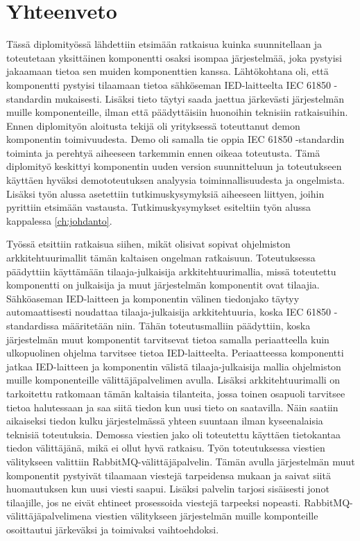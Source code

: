 \chapter{Yhteenveto}
\label{ch:yhteenveto}
Tässä diplomityössä lähdettiin etsimään ratkaisua kuinka suunnitellaan ja toteutetaan yksittäinen komponentti osaksi isompaa järjestelmää, joka pystyisi jakaamaan tietoa sen muiden komponenttien kanssa. Lähtökohtana oli, että komponentti pystyisi tilaamaan tietoa sähköseman IED-laitteelta IEC 61850 -standardin mukaisesti. Lisäksi tieto täytyi saada jaettua järkevästi järjestelmän muille komponenteille, ilman että päädyttäisiin huonoihin teknisiin ratkaisuihin. Ennen diplomityön aloitusta tekijä oli yrityksessä toteuttanut demon komponentin toimivuudesta. Demo oli samalla tie oppia IEC 61850 -standardin toiminta ja perehtyä aiheeseen tarkemmin ennen oikeaa toteutusta. Tämä diplomityö keskittyi komponentin uuden version suunnitteluun ja toteutukseen käyttäen hyväksi demototeutuksen analyysia toiminnallisuudesta ja ongelmista. Lisäksi työn alussa asetettiin tutkimuskysymyksiä aiheeseen liittyen, joihin pyrittiin etsimään vastausta. Tutkimuskysymykset esiteltiin työn alussa kappalessa \ref{ch:johdanto}.

Työssä etsittiin ratkaisua siihen, mikät olisivat sopivat ohjelmiston arkkitehtuurimallit tämän kaltaisen ongelman ratkaisuun. Toteutuksessa päädyttiin käyttämään tilaaja-julkaisija arkkitehtuurimallia, missä toteutettu komponentti on julkaisija ja muut järjestelmän komponentit ovat tilaajia. Sähköaseman IED-laitteen ja komponentin välinen tiedonjako täytyy automaattisesti noudattaa tilaaja-julkaisija arkkitehtuuria, koska IEC 61850 -stan\-dar\-dis\-sa määritetään niin. Tähän toteutusmalliin päädyttiin, koska järjestelmän muut komponentit tarvitsevat tietoa samalla periaatteella kuin ulkopuolinen ohjelma tarvitsee tietoa IED-laitteelta. Periaatteessa komponentti jatkaa IED-laitteen ja komponentin välistä tilaaja-julkaisija mallia ohjelmiston muille komponenteille välittäjäpalvelimen avulla. Lisäksi arkkitehtuurimalli on tarkoitettu ratkomaan tämän kaltaisia tilanteita, jossa toinen osapuoli tarvitsee tietoa halutessaan ja saa siitä tiedon kun uusi tieto on saatavilla. Näin saatiin aikaiseksi tiedon kulku järjestelmässä yhteen suuntaan ilman kyseenalaisia teknisiä toteutuksia. Demossa viestien jako oli toteutettu käyttäen tietokantaa tiedon välittäjänä, mikä ei ollut hyvä ratkaisu. Työn toteutuksessa viestien välitykseen valittiin RabbitMQ-välittäjäpalvelin. Tämän avulla järjestelmän muut komponentit pystyivät tilaamaan viestejä tarpeidensa mukaan ja saivat siitä huomautuksen kun uusi viesti saapui. Lisäksi palvelin tarjosi sisäisesti jonot tilaajille, jos ne eivät ehtineet prosessoida viestejä tarpeeksi nopeasti. RabbitMQ-välittäjäpalvelimena viestien välitykseen järjestelmän muille komponteille osoittautui järkeväksi ja toimivaksi vaihtoehdoksi.

